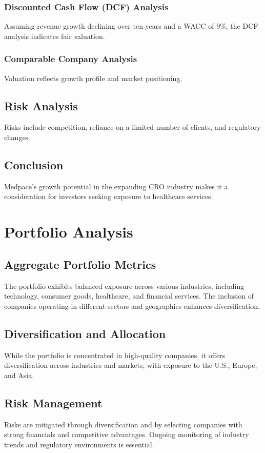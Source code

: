 \documentclass[12pt]{report}
\begin{document}
\subsection{Discounted Cash Flow (DCF) Analysis}
Assuming revenue growth declining over ten years and a WACC of 9\%, the DCF analysis indicates fair valuation.

\subsection{Comparable Company Analysis}
Valuation reflects growth profile and market positioning.

\section{Risk Analysis}
Risks include competition, reliance on a limited number of clients, and regulatory changes.

\section{Conclusion}
Medpace's growth potential in the expanding CRO industry makes it a consideration for investors seeking exposure to healthcare services.

\chapter{Portfolio Analysis}
\section{Aggregate Portfolio Metrics}
The portfolio exhibits balanced exposure across various industries, including technology, consumer goods, healthcare, and financial services. The inclusion of companies operating in different sectors and geographies enhances diversification.

\section{Diversification and Allocation}
While the portfolio is concentrated in high-quality companies, it offers diversification across industries and markets, with exposure to the U.S., Europe, and Asia.

\section{Risk Management}
Risks are mitigated through diversification and by selecting companies with strong financials and competitive advantages. Ongoing monitoring of industry trends and regulatory environments is essential.
\end{document}
